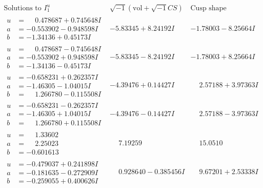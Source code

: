 \documentclass[1p]{elsarticle_modified}
\theoremstyle{definition}
\newcommand{\I}{\sqrt{-1}}
\begin{document}
$$\begin{array}{c|c|c}  
\text{Solutions to }I^u_{1}& \I (\text{vol} + \sqrt{-1}CS) & \text{Cusp shape}\\
 \hline 
\begin{aligned}
u &= \phantom{-}0.478687 + 0.745648 I \\
a &= -0.553902 - 0.948598 I \\
b &= -1.34136 + 0.45173 I\end{aligned}
 & -5.83345 + 8.24192 I & -1.78003 - 8.25664 I \\ \hline\begin{aligned}
u &= \phantom{-}0.478687 - 0.745648 I \\
a &= -0.553902 + 0.948598 I \\
b &= -1.34136 - 0.45173 I\end{aligned}
 & -5.83345 - 8.24192 I & -1.78003 + 8.25664 I \\ \hline\begin{aligned}
u &= -0.658231 + 0.262357 I \\
a &= -1.46305 - 1.04015 I \\
b &= \phantom{-}1.266780 - 0.115508 I\end{aligned}
 & -4.39476 + 0.14427 I & \phantom{-}2.57188 + 3.97363 I \\ \hline\begin{aligned}
u &= -0.658231 - 0.262357 I \\
a &= -1.46305 + 1.04015 I \\
b &= \phantom{-}1.266780 + 0.115508 I\end{aligned}
 & -4.39476 - 0.14427 I & \phantom{-}2.57188 - 3.97363 I \\ \hline\begin{aligned}
u &= \phantom{-}1.33602\phantom{ +0.000000I} \\
a &= \phantom{-}2.25023\phantom{ +0.000000I} \\
b &= -0.601613\phantom{ +0.000000I}\end{aligned}
 & \phantom{-}7.19259\phantom{ +0.000000I} & \phantom{-}15.0510\phantom{ +0.000000I} \\ \hline\begin{aligned}
u &= -0.479037 + 0.241898 I \\
a &= -0.181635 - 0.272909 I \\
b &= -0.259055 + 0.400626 I\end{aligned}
 & \phantom{-}0.928640 - 0.385456 I & \phantom{-}9.67201 + 2.53338 I \\ \hline\begin{aligned}

\end{aligned}
\end{array}$$
\end{document}
